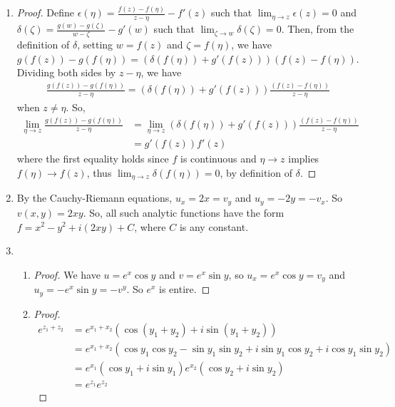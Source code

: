 \documentclass[11pt, letterpaper]{article}
\begin{document}
\thispagestyle{firststyle}


\begin{enumerate}
  \item \begin{proof}
    Define $\epsilon(\eta) = \frac{f(z) - f(\eta)}{z - \eta} - f'(z)$ such that $\lim_{\eta \to z} \epsilon(z) = 0$ and $\delta(\zeta) = \frac{g(w) - g(\zeta)}{w - \zeta} - g'(w)$ such that $\lim_{\zeta \to w} \delta(\zeta) = 0$. Then, from the definition of $\delta$, setting $w = f(z)$ and $\zeta = f(\eta)$, we have
      $g(f(z)) - g(f(\eta)) = (\delta(f(\eta)) + g'(f(z)))(f(z) - f(\eta))$. Dividing both sides by $z - \eta$, we have 
      \begin{align*}
        \frac{g(f(z)) - g(f(\eta))}{z - \eta} = (\delta(f(\eta)) + g'(f(z)))\frac{(f(z) - f(\eta))}{z - \eta}
      \end{align*}
      when $z \neq \eta$. So,
      \begin{align*}
        \lim_{\eta \to z}\frac{g(f(z)) - g(f(\eta))}{z - \eta} 
        &= \lim_{\eta \to z}(\delta(f(\eta)) + g'(f(z)))\frac{(f(z) - f(\eta))}{z - \eta} \\
        &= g'(f(z)) f'(z)
      \end{align*}
      where the first equality holds since $f$ is continuous and $\eta \to z$ implies $f(\eta) \to f(z)$, thus $\lim_{\eta \to z}\delta(f(\eta)) = 0$, by definition of $\delta$.
    \end{proof}
  \item By the Cauchy-Riemann equations, $u_x = 2x = v_y$ and $u_y = -2y = -v_x$. So $v(x, y) = 2xy$. So, all such analytic functions have the form $f = x^2 - y^2 + i(2xy) + C$, where $C$ is any constant.
  
  \item \begin{enumerate}
    \item \begin{proof}
      We have $u = e^x \cos y$ and $v = e^x \sin y$, so
      $u_x = e^x \cos y = v_y$ and $u_y = -e^x \sin y = -v^y$. So $e^x$ is entire.
    \end{proof}

    \item \begin{proof}
      \begin{align*}
        e^{z_1 + z_2} &= e^{x_1 + x_2} (\cos (y_1 + y_2) + i\sin(y_1 + y_2)) \\
        &= e^{x_1 + x_2}(\cos y_1 \cos y_2 - \sin y_1 \sin y_2 + i\sin y_1 \cos y_2 + i\cos y_1 \sin y_2) \\
        &= e^{x_1} (\cos y_1 + i \sin y_1) e^{x_2} (\cos y_2 + i \sin y_2) \\
        &= e^{z_1} e^{z_2}
      \end{align*}
    \end{proof}
  \end{enumerate}


\end{enumerate}
\end{document}
